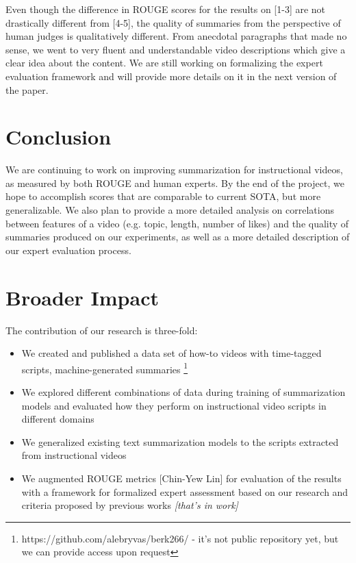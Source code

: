 \documentclass{article}
\begin{document}
Even though the difference in ROUGE scores for the results on [1-3] are not drastically different from [4-5], the quality of summaries from the perspective of human judges is qualitatively different. From anecdotal paragraphs that made no sense, we went to very fluent and understandable video descriptions which give a clear idea about the content. We are still working on formalizing the expert evaluation framework and will provide more details on it in the next version of the paper. 

\section{Conclusion}
We are continuing to work on improving summarization for instructional videos, as measured by both ROUGE and human experts. By the end of the project, we hope to accomplish scores that are comparable to current SOTA, but more generalizable. We also plan to provide a more detailed analysis on correlations between features of a video (e.g. topic, length, number of likes) and the quality of summaries produced on our experiments, as well as a more detailed description of our expert evaluation process.


\section*{Broader Impact}

The contribution of our research is three-fold:
\begin{itemize}

\item We created and published a data set of how-to videos with time-tagged scripts, machine-generated summaries \footnote{https://github.com/alebryvas/berk266/ - it's not public repository yet, but we can provide access upon request}
\item We explored different combinations of data during training of summarization models and evaluated how they perform on instructional video scripts in different domains
\item We generalized  existing text summarization models to the scripts extracted from instructional videos  
\item We augmented ROUGE metrics [Chin-Yew Lin] for evaluation of the results with a framework for formalized expert assessment based on our research and criteria proposed by previous works \textit{[that's in work]}
\end{itemize}
\end{document}
